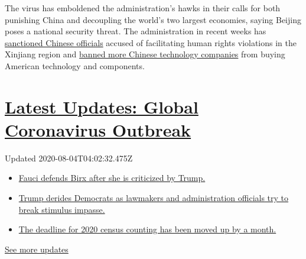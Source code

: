The virus has emboldened the administration's hawks in their calls for
both punishing China and decoupling the world's two largest economies,
saying Beijing poses a national security threat. The administration in
recent weeks has
\href{https://www.nytimes.com/2020/07/31/us/politics/sanctions-china-xinjiang-uighurs.html}{sanctioned
Chinese officials} accused of facilitating human rights violations in
the Xinjiang region and
\href{https://www.nytimes.com/2020/07/20/business/economy/china-sanctions-uighurs-labor.html}{banned
more Chinese technology companies} from buying American technology and
components.

\hypertarget{latest-updates-global-coronavirus-outbreak}{%
\section{\texorpdfstring{\href{https://www.nytimes.com/2020/08/03/world/coronavirus-covid-19.html?action=click\&pgtype=Article\&state=default\&region=MAIN_CONTENT_1\&context=storylines_live_updates}{Latest
Updates: Global Coronavirus
Outbreak}}{Latest Updates: Global Coronavirus Outbreak}}\label{latest-updates-global-coronavirus-outbreak}}

Updated 2020-08-04T04:02:32.475Z

\begin{itemize}
\tightlist
\item
  \href{https://www.nytimes.com/2020/08/03/world/coronavirus-covid-19.html?action=click\&pgtype=Article\&state=default\&region=MAIN_CONTENT_1\&context=storylines_live_updates\#link-4547638f}{Fauci
  defends Birx after she is criticized by Trump.}
\item
  \href{https://www.nytimes.com/2020/08/03/world/coronavirus-covid-19.html?action=click\&pgtype=Article\&state=default\&region=MAIN_CONTENT_1\&context=storylines_live_updates\#link-15e7f995}{Trump
  derides Democrats as lawmakers and administration officials try to
  break stimulus impasse.}
\item
  \href{https://www.nytimes.com/2020/08/03/world/coronavirus-covid-19.html?action=click\&pgtype=Article\&state=default\&region=MAIN_CONTENT_1\&context=storylines_live_updates\#link-e5a2cda}{The
  deadline for 2020 census counting has been moved up by a month.}
\end{itemize}

\href{https://www.nytimes.com/2020/08/03/world/coronavirus-covid-19.html?action=click\&pgtype=Article\&state=default\&region=MAIN_CONTENT_1\&context=storylines_live_updates}{See
more updates}

